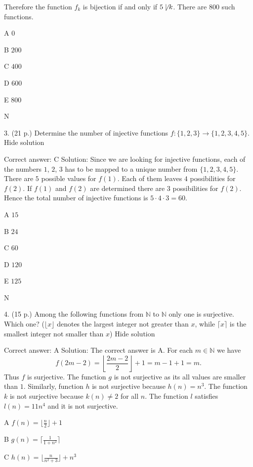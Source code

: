 Therefore the function \( f_k \) is bijection if and only if \( 5\not\mid k \). There are \( 800 \) such functions.

   A    \( 0 \)

   B    \( 200 \)

   C    \( 400 \)

   D    \( 600 \)

   E    \( 800 \)

   N
	

3.	(21 p.)
	Determine the number of injective functions \( f:\{1,2,3\}\to\{1,2,3,4,5\} \).
Hide solution

Correct answer: C
Solution: Since we are looking for injective functions, each of the numbers \( 1 \), \( 2 \), \( 3 \) has to be mapped to a unique number from \( \{1,2,3,4,5\} \). There are \( 5 \) possible values for \( f(1) \). Each of them leaves \( 4 \) possibilities for \( f(2) \). If \( f(1) \) and \( f(2) \) are determined there are \( 3 \) possibilities for \( f(2) \). Hence the total number of injective functions is \( 5\cdot 4\cdot 3=60 \).

   A    \( 15 \)

   B    \( 24 \)

   C    \( 60 \)

   D    \( 120 \)

   E    \( 125 \)

   N
	

4.	(15 p.)
	Among the following functions from \( \mathbb N \) to \( \mathbb N \) only one is surjective. Which one? (\( \lfloor x\rfloor \) denotes the largest integer not greater than \( x \), while \( \lceil x\rceil \) is the smallest integer not smaller than \( x \))
Hide solution

Correct answer: A
Solution: The correct answer is A. For each \( m\in\mathbb N \) we have \[ f(2m-2)=\left\lfloor\frac{2m-2}2\right\rfloor+1=m-1+1=m.\] Thus \( f \) is surjective. The function \( g \) is not surjective as its all values are smaller than \( 1 \). Similarly, function \( h \) is not surjective because \( h(n)=n^3 \). The function \( k \) is not surjective because \( k(n)\neq 2 \) for all \( n \). The function \( l \) satisfies \( l(n)=11n^4 \) and it is not surjective.

   A    \( f(n)=\lfloor\frac n2\rfloor +1 \)

   B    \( g(n)=\lceil\frac1{1+n^2}\rceil \)

   C    \( h(n)=\lfloor\frac{n}{n^2+3}\rfloor+n^3 \)

